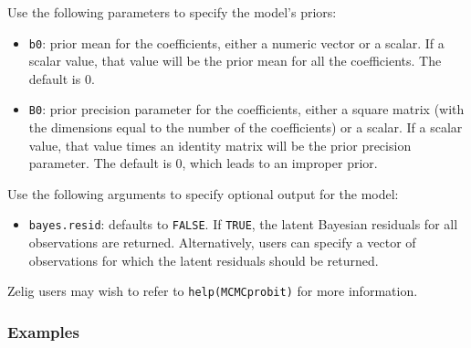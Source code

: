 Use the following parameters to specify the model's priors:  
\begin{itemize}
\item \texttt{b0}: prior mean for the coefficients, either a numeric
vector or a scalar. If a scalar value, that value will be the prior
mean for all the coefficients. The default is 0.

\item \texttt{B0}: prior precision parameter for the coefficients,
either a square matrix (with the dimensions equal to the number of the
coefficients) or a scalar. If a scalar value, that value times an
identity matrix will be the prior precision parameter. The default is
0, which leads to an improper prior.
\end{itemize}

Use the following arguments to specify optional output for the model:
\begin{itemize}
\item \texttt{bayes.resid}: defaults to {\tt FALSE}.  If {\tt TRUE},
the latent Bayesian residuals for all observations are returned.
Alternatively, users can specify a vector of observations for which the
latent residuals should be returned.

\end{itemize}

Zelig users may wish to refer to \texttt{help(MCMCprobit)} for more 
information.



\subsubsection{Examples}

